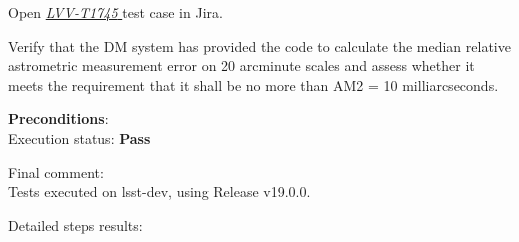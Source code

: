 \documentclass[DM,lsstdraft,STR,toc]{lsstdoc}
\begin{document}
Open  \href{https://jira.lsstcorp.org/secure/Tests.jspa#/testCase/LVV-T1745}{\textit{ LVV-T1745 } }
test case in Jira.

 Verify that the DM system has provided the code to calculate the median
relative astrometric measurement error on 20 arcminute scales and assess
whether it meets the requirement that it shall be no more than AM2 = 10
milliarcseconds.


\textbf{ Preconditions}:\\


Execution status: {\bf Pass }

Final comment:\\ Tests executed on lsst-dev, using Release v19.0.0.



Detailed steps results:
\end{document}
